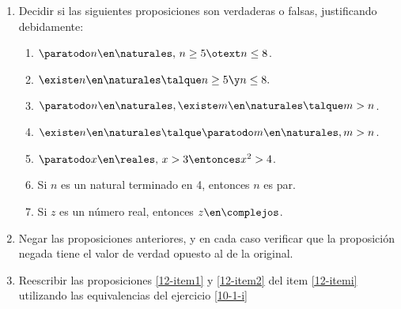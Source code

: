 \begin{enunciado}{\ejercicio}
  \begin{enumerate}[label=\roman*)]
    \item\label{12-itemi}
          Decidir si las siguientes proposiciones son verdaderas o falsas, justificando debidamente:
          \begin{multicols}{2}
            \begin{enumerate}[label=\alph*)]
              \item $\paratodo n \en \naturales,\, n \geq 5 \otext n \leq 8$.
              \item $\existe n \en \naturales \talque n \geq 5 \y n\leq 8.$
              \item $\paratodo n \en \naturales, \existe m \en \naturales \talque m > n$.
              \item $\existe n \en \naturales \talque \paratodo m \en \naturales, m >n$.
              \item\label{12-item1} $\paratodo x \en \reales,\, x > 3 \entonces x^2 > 4$.
              \item\label{12-item2} Si $n$ es un natural terminado en 4, entonces $n$ es par.
              \item Si $z$ es un número real, entonces $z \en \complejos$.
            \end{enumerate}
          \end{multicols}

    \item Negar las proposiciones anteriores, y en cada caso verificar que la proposición negada tiene el valor de verdad
          opuesto al de la original.

    \item Reescribir las proposiciones \ref{12-item1} y \ref{12-item2} del item \ref{12-itemi}
          utilizando las equivalencias del ejercicio \ref{10-1-i}
  \end{enumerate}
\end{enunciado}

